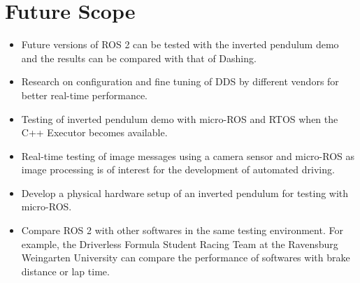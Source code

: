 \documentclass[%
xelatex,
	oneside,		%
	12pt,			%
	parskip=half,	%
	abstracton,
	chapterprefix=true%
    appendixprefix=true]
{scrbook}
\begin{document}
\section{Future Scope}
\vspace*{0.5cm}
\begin{itemize}
\item Future versions of ROS 2 can be tested with the inverted pendulum demo and the results can be compared with that of Dashing.
\item Research on configuration and fine tuning of DDS by different vendors for better real-time performance. 
\item Testing of inverted pendulum demo with micro-ROS and RTOS when the C++ Executor becomes available.
\item Real-time testing of image messages using a camera sensor and micro-ROS as image processing is of interest for the development of automated driving.
\item Develop a physical hardware setup of an inverted pendulum for testing with micro-ROS.
\item Compare ROS 2 with other softwares in the same testing environment. For example, the Driverless Formula Student Racing Team at the Ravensburg Weingarten University can compare the performance of softwares with brake distance or lap time.
\end{itemize}
	\listoffigures
	\listoftables
		
		

\end{document}
